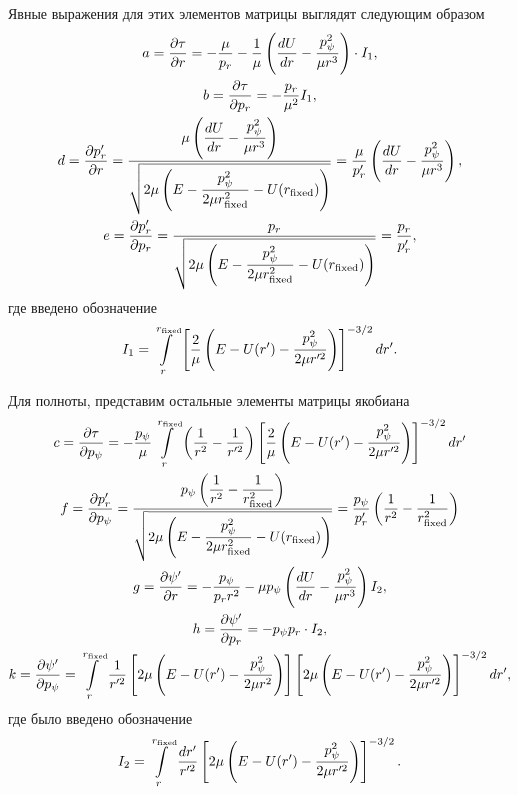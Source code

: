 Явные выражения для этих элементов матрицы выглядят следующим образом 
\begin{gather}
    a = \frac{\partial \tau}{\partial r} = -\frac{\mu}{p_r} - \frac{1}{\mu} \left( \frac{dU}{dr} - \frac{p_\psi^2}{\mu r^3} \right) \cdot I_1, \\ 
    b = \frac{\partial \tau}{\partial p_r} = - \frac{p_r}{\mu^2} I_1, \\ 
    d = \frac{\partial p_r^\prime}{\partial r} = \frac{\displaystyle \mu \left( \frac{dU}{dr} - \frac{p_\psi^2}{\mu r^3} \right)}{\displaystyle \sqrt{2\mu \left( E - \frac{p_\psi^2}{2 \mu r_\text{fixed}^2} - U(r_\text{fixed}) \right)}} = \frac{\mu}{p_r^\prime} \left( \frac{dU}{dr} - \frac{p_\psi^2}{\mu r^3} \right), \\
    e = \frac{\partial p_r^\prime}{\partial p_r} = \frac{p_r}{\displaystyle \sqrt{2\mu \left( E - \frac{p_\psi^2}{2 \mu r_\text{fixed}^2} - U(r_\text{fixed}) \right)}} = \frac{p_r}{p_r^\prime},
\end{gather}
%
где введено обозначение 
\begin{gather}
    I_1 = \int\limits_r^{r_\text{fixed}} \left[ \frac{2}{\mu} \left( E - U(r^\prime) - \frac{p_\psi^2}{2 \mu r^{\prime 2}} \right) \right]^{-3/2} dr^\prime. 
\end{gather}

Для полноты, представим остальные элементы матрицы якобиана
\begin{gather}
    c = \frac{\partial \tau}{\partial p_\psi} = -\frac{p_\psi}{\mu} \int\limits_r^{r_\text{fixed}} \left( \frac{1}{r^2} - \frac{1}{r^{\prime 2}} \right) \left[ \frac{2}{\mu} \left( E - U(r^\prime) - \frac{p_\psi^2}{2 \mu r^{\prime 2}} \right) \right]^{-3/2} dr^\prime \\
f = \frac{\partial p_r^\prime}{\partial p_\psi} = \frac{\displaystyle p_\psi \left( \frac{1}{r^2} - \frac{1}{r_\text{fixed}^2} \right)}{\displaystyle \sqrt{2 \mu \left( E - \frac{p_\psi^2}{2 \mu r_\text{fixed}^2} - U(r_\text{fixed}) \right)}} = \frac{p_\psi}{p_r^\prime} \left( \frac{1}{r^2} - \frac{1}{r_\text{fixed}^2} \right) \\
    g = \frac{\partial \psi^\prime}{\partial r} = -\frac{p_\psi}{p_r r^2} - \mu p_\psi \left( \frac{dU}{dr} - \frac{p_\psi^2}{\mu r^3} \right) I_2, \\ 
    h = \frac{\partial \psi^\prime}{\partial p_r} = -p_\psi p_r \cdot I_2, \\ 
    k = \frac{\partial \psi^\prime}{\partial p_\psi} = \int\limits_r^{r_\text{fixed}} \frac{1}{r^{\prime 2}} \left[ 2 \mu \left( E - U(r^\prime) - \frac{p_\psi^2}{2 \mu r^2} \right) \right] \left[ 2 \mu \left( E - U(r^\prime) - \frac{p_\psi^2}{2 \mu r^{\prime 2}} \right)\right]^{-3/2} dr^\prime,
\end{gather}
%
где было введено обозначение
\begin{gather}
    I_2 = \int\limits_r^{r_\text{fixed}} \frac{dr^\prime}{r^{\prime 2}} \left[ 2 \mu \left( E - U(r^\prime) - \frac{p_\psi^2}{2 \mu r^{\prime 2}} \right) \right]^{-3/2}.
\end{gather}

